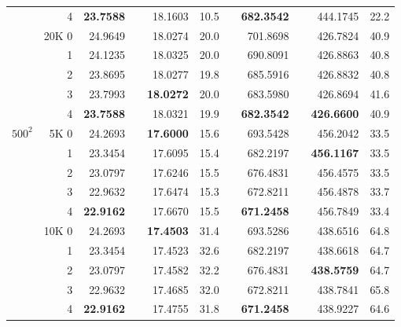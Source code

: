 \begin{table}[p!]
{\begin{tabular*}{\hsize}{crrrrrlrrrr}
                &     4   & {\bf 23.7588} &      &      18.1603  &  10.5 &  & {\bf 682.3542} &      &      444.1745  &  22.2 \\
\cline{2-11}
                & 20K 0   &      24.9649  &      &      18.0274  &  20.0 &  &      701.8698  &      &      426.7824  &  40.9 \\
                &     1   &      24.1235  &      &      18.0325  &  20.0 &  &      690.8091  &      &      426.8863  &  40.8 \\
                &     2   &      23.8695  &      &      18.0277  &  19.8 &  &      685.5916  &      &      426.8832  &  40.8 \\
                &     3   &      23.7993  &      & {\bf 18.0272} &  20.0 &  &      683.5980  &      &      426.8694  &  41.6 \\
                &     4   & {\bf 23.7588} &      &      18.0321  &  19.9 &  & {\bf 682.3542} &      & {\bf 426.6600} &  40.9 \\
\hline
$500^2$         &  5K 0   &      24.2693  &      & {\bf 17.6000} &  15.6 &  &      693.5428  &      &      456.2042  &  33.5 \\
                &     1   &      23.3454  &      &      17.6095  &  15.4 &  &      682.2197  &      & {\bf 456.1167} &  33.5 \\
                &     2   &      23.0797  &      &      17.6246  &  15.5 &  &      676.4831  &      &      456.4575  &  33.5 \\
                &     3   &      22.9632  &      &      17.6474  &  15.3 &  &      672.8211  &      &      456.4878  &  33.7 \\
                &     4   & {\bf 22.9162} &      &      17.6670  &  15.5 &  & {\bf 671.2458} &      &      456.7849  &  33.4 \\
\cline{2-11}
                & 10K 0   &      24.2693  &      & {\bf 17.4503} &  31.4 &  &      693.5286  &      &      438.6516  &  64.8 \\
                &     1   &      23.3454  &      &      17.4523  &  32.6 &  &      682.2197  &      &      438.6618  &  64.7 \\
                &     2   &      23.0797  &      &      17.4582  &  32.2 &  &      676.4831  &      & {\bf 438.5759} &  64.7 \\
                &     3   &      22.9632  &      &      17.4685  &  32.0 &  &      672.8211  &      &      438.7841  &  65.8 \\
                &     4   & {\bf 22.9162} &      &      17.4755  &  31.8 &  & {\bf 671.2458} &      &      438.9227  &  64.6 \\

\end{tabular*}}
\end{table}
